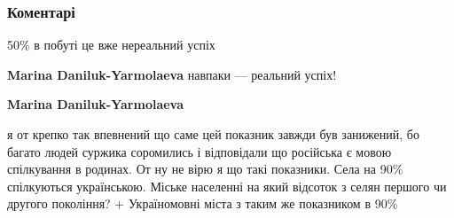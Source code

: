  
 
 
 
 
\subsubsection{Коментарі}

\begin{itemize}
 

50\% в побуті це вже нереальний успіх

\begin{itemize}
 
\textbf{Marina Daniluk-Yarmolaeva} навпаки — реальний успіх!

 
\textbf{Marina Daniluk-Yarmolaeva} 

я от крепко так впевнений що саме цей
показник завжди був занижений, бо багато людей суржика соромились і відповідали
що російська є мовою спілкування в родинах. От ну не вірю я що такі показники.
Села на 90\% спілкуються українською. Міське населенні на який відсоток з селян
першого чи другого покоління? + Україномовні міста з таким же показником в 90\%

 

\end{itemize}
\end{itemize}
